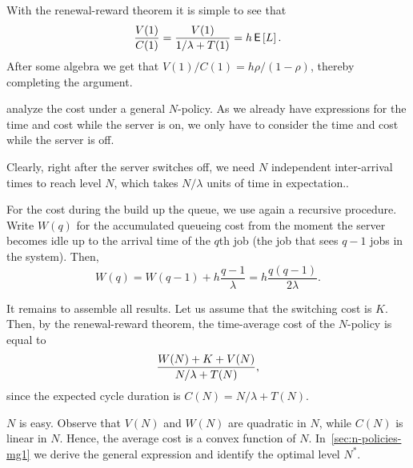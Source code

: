 With  the renewal-reward theorem it is simple to see that
\begin{equation*}
  \frac{V(1)}{C(1)} = \frac{V(1)}{1/\lambda + T(1)} = h \,\mathsf{E}\left[L\right].
\end{equation*}
After some algebra we get that $V(1)/C(1)=h\rho/(1-\rho)$, thereby completing the argument.

 analyze the cost under a general $N$-policy.
As we already have expressions for the time and cost while the server is on, we only have to consider the time and cost while the server is off.

Clearly, right after the server switches off, we need $N$ independent inter-arrival times to reach level $N$, which takes $N/\lambda$ units of time in expectation..

For the cost during the build up the queue, we use again a recursive procedure.
Write $W(q)$ for the accumulated queueing cost
from the moment the server becomes idle up to the arrival time of the $q$th job (the job that sees $q-1$ jobs in the system).
Then,
\begin{equation}\label{eq:99}
  W(q) = W(q-1) + h\frac{q-1}{\lambda} = h \frac{q(q-1)}{2\lambda}.
\end{equation}

It remains to assemble all results. Let us assume that the switching cost is $K$. Then, by the renewal-reward theorem, the time-average cost of the $N$-policy is equal to
\begin{equation*}
  \frac{W(N)+K+V(N)}{N/\lambda + T(N)},
\end{equation*}
since the expected cycle duration is $C(N) = N/\lambda + T(N)$.

 $N$ is easy.
Observe that $V(N)$ and $W(N)$ are quadratic in $N$, while $C(N)$ is linear in $N$.
Hence, the average cost is a convex function of $N$.
In~\cref{sec:n-policies-mg1} we derive the general expression and identify the optimal level $N^*$.


